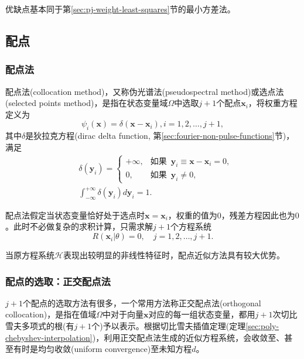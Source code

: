 优缺点基本同于第\ref{sec:pj-weight-least-squares}节的最小方差法。

\subsection{配点}
\label{sec:pj-weight-collocation}
\subsubsection{配点法}
\label{sec:pj-weight-collocation-method}
配点法(collocation method)，又称伪光谱法(pseudospectral method)或选点法(selected points method)，是指在状态变量域$\Omega$中选取$j+1$个配点$\bm{x}_i$，将权重方程定义为
\begin{equation*}
  \psi_i(\bm{x}) = \delta(\bm{x} - \bm{x}_i), i=1,2,\ldots,j+1,
\end{equation*}
其中$\delta$是狄拉克方程(dirac delta function, 第\ref{sec:fourier-non-pulse-functions}节)，满足
\begin{equation*}
  \begin{split}
    &\delta(\bm{y}_i) = \begin{cases}
    +\infty, &\text{如果 }\, \bm{y}_i \equiv \bm{x} - \bm{x}_i =0,\\
     0, &\text{如果 }\, \bm{y}_i \neq 0,
    \end{cases} \\
    &\int_{-\infty}^{+\infty} \delta(\bm{y}_i) d \bm{y}_i
 = 1.
  \end{split}
\end{equation*}

配点法假定当状态变量恰好处于选点时$\bm{x} = \bm{x}_i$，权重的值为$0$，残差方程因此也为$0$。此时不必做复杂的求积计算，只需求解$j+1$个方程系统
\begin{equation*}
  R\left( \bm{x}_i | \theta \right) =0, \quad j=1,2,\ldots,j+1.
\end{equation*}

当原方程系统$\mathcal{H}$表现出较明显的非线性特征时，配点近似方法具有较大优势。

\subsubsection{配点的选取：正交配点法}
\label{sec:pj-weight-collocation-orthogonal}

$j+1$个配点的选取方法有很多，一个常用方法称正交配点法(orthogonal collocation)，是指在值域$\Omega$中对于向量$\bm{x}$对应的每一组状态变量，都用$j+1$次切比雪夫多项式的根(有$j+1$个)予以表示。根据切比雪夫插值定理(定理\ref{sec:poly-chebyshev-interpolation})，利用正交配点法生成的近似方程系统，会收敛至、甚至有时是均匀收敛(uniform convergence)至未知方程$d$。

